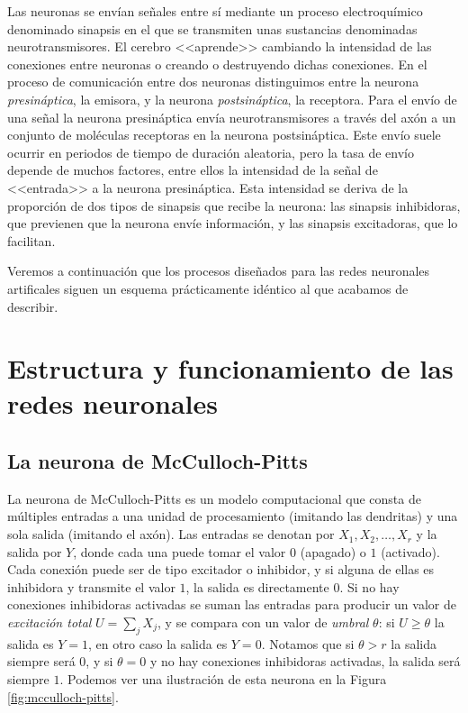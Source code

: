 \documentclass[
  a4paper,
  12pt,
  spanish,
]{scrartcl}
\theoremstyle{teorema-style}
\begin{document}
Las neuronas se envían señales entre sí mediante un proceso electroquímico denominado sinapsis en el que se transmiten unas sustancias denominadas neurotransmisores.
El cerebro <<aprende>> cambiando la intensidad de las conexiones entre neuronas o creando o destruyendo dichas conexiones.
En el proceso de comunicación entre dos neuronas distinguimos entre la neurona \textit{presináptica}, la emisora, y la neurona \textit{postsináptica}, la receptora.
Para el envío de una señal la neurona presináptica envía neurotransmisores a través del axón a un conjunto de moléculas receptoras en la neurona postsináptica.
Este envío suele ocurrir en periodos de tiempo de duración aleatoria, pero la tasa de envío depende de muchos factores, entre ellos la intensidad de la señal de <<entrada>> a la neurona presináptica.
Esta intensidad se deriva de la proporción de dos tipos de sinapsis que recibe la neurona: las sinapsis inhibidoras, que previenen que la neurona envíe información, y las sinapsis excitadoras, que lo facilitan.

Veremos a continuación que los procesos diseñados para las redes neuronales artificales siguen un esquema prácticamente idéntico al que acabamos de describir.

\section{Estructura y funcionamiento de las redes neuronales}
\label{sec:estructura}

\subsection{La neurona de McCulloch-Pitts}

La neurona de McCulloch-Pitts \parencite{mcculloch_logical_1943} es un modelo computacional que consta de múltiples entradas a una unidad de procesamiento (imitando las dendritas) y una sola salida (imitando el axón). Las entradas se denotan por $X_1,X_2,\dots, X_r$ y la salida por $Y$, donde cada una puede tomar el valor $0$ (apagado) o $1$ (activado). Cada conexión puede ser de tipo excitador o inhibidor, y si alguna de ellas es inhibidora y transmite el valor $1$, la salida es directamente $0$. Si no hay conexiones inhibidoras activadas se suman las entradas para producir un valor de \textit{excitación total} $U = \sum_{j} X_j$, y se compara con un valor de \textit{umbral} $\theta$: si $U \ge \theta$ la salida es $Y=1$, en otro caso la salida es $Y=0$. Notamos que si $\theta > r$ la salida siempre será $0$, y si $\theta = 0$ y no hay conexiones inhibidoras activadas, la salida será siempre $1$. Podemos ver una ilustración de esta neurona en la Figura \ref{fig:mcculloch-pitts}.
\end{document}
